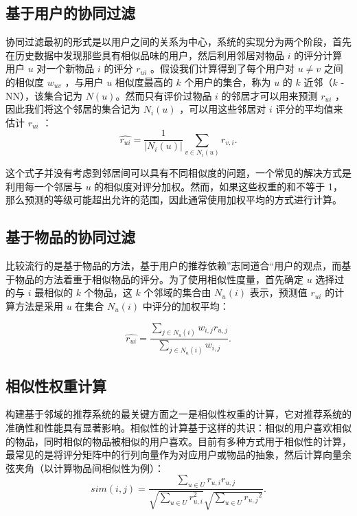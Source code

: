 \subsection{基于用户的协同过滤}
协同过滤最初的形式是以用户之间的关系为中心\cite{Desrosiers2011A}，系统的实现分为两个阶段，首先在历史数据中发现那些具有相似品味的用户，然后利用邻居对物品 $i$ 的评分计算用户 $u$ 对一个新物品 $i$ 的评分 $r_{ui}$ 。假设我们计算得到了每个用户对 $u \neq v$ 之间的相似度 $w_{uv}$ ，与用户 $u$ 相似度最高的 $k$ 个用户的集合，称为 $u$ 的 $k$ 近邻（$k$ -NN），该集合记为 $N(u)$。然而只有评价过物品 $i$ 的邻居才可以用来预测 $r_{ui}$ ，因此我们将这个邻居的集合记为  $N_i (u)$ ，可以用这些邻居对 $i$ 评分的平均值来估计  $r_{ui}$ ：
\begin{equation}
\hat{r_{ui}} = \dfrac {1}  {| N_i (u) | }   \sum_{v \in  N_i (u)}{ r_{v,i} } .
\end{equation}

这个式子并没有考虑到邻居间可以具有不同相似度的问题，一个常见的解决方式是利用每一个邻居与 $u$ 的相似度对评分加权。然而，如果这些权重的和不等于 1，那么预测的等级可能超出允许的范围，因此通常使用加权平均的方式进行计算。

\subsection{基于物品的协同过滤}
比较流行的是基于物品的方法\cite{Sarwar2001Item}，基于用户的推荐依赖”志同道合“用户的观点，而基于物品的方法着重于相似物品的评分。为了使用相似性度量，首先确定 $u$ 选择过的与 $i$ 最相似的 $k$ 个物品，这 $k$ 个邻域的集合由 $N_u (i)$  表示，预测值 $r_{ui}$ 的计算方法是采用 $u$ 在集合 $N_u (i)$  中评分的加权平均：

\begin{equation}
\hat{r_{ui}} = \dfrac { \sum\limits_{j \in N_u (i)} w_{i,j} r_{u,j}}  {\sum\limits_{j \in N_u (i)} w_{i,j} } .
\end{equation}


\subsection{相似性权重计算}
构建基于邻域的推荐系统的最关键方面之一是相似性权重的计算，它对推荐系统的准确性和性能具有显著影响。相似性的计算基于这样的共识：相似的用户喜欢相似的物品，同时相似的物品被相似的用户喜欢。目前有多种方式用于相似性的计算，最常见的是将评分矩阵中的行列向量作为对应用户或物品的抽象，然后计算向量余弦夹角（以计算物品间相似性为例）：
\begin{equation}
sim(i,j) = \dfrac{\sum\limits_{u \in U} r_{u,i}  r_{u,j}} {   \sqrt {\sum\limits_{u \in U}  r_{u,i}^2  }    \sqrt {\sum\limits_{u \in U}  {r_{u,j}}^2  }  } .
\end{equation}

